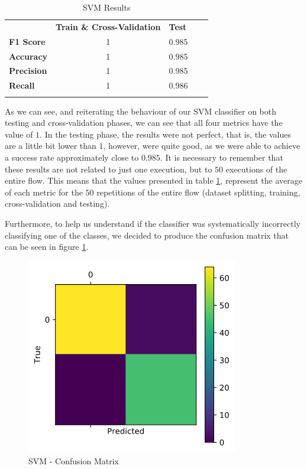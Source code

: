 \begin{table}[H]
\centering
\caption{SVM Results}
\begin{tabular}{ccccc}
\cline{2-3}
\multicolumn{1}{l|}{}                & \multicolumn{1}{l|}{\textbf{Train \& Cross-Validation}} & \multicolumn{1}{l|}{\textbf{Test}} &  &  \\ \cline{1-3}
\multicolumn{1}{|l|}{\textbf{F1 Score}} & \multicolumn{1}{c|}{1}                     & \multicolumn{1}{c|}{0.985}                              &  &  \\ \cline{1-3}
\multicolumn{1}{|l|}{\textbf{Accuracy}} & \multicolumn{1}{c|}{1}                     & \multicolumn{1}{c|}{0.985}                              &  &  \\ \cline{1-3}
\multicolumn{1}{|l|}{\textbf{Precision}} & \multicolumn{1}{c|}{1} & \multicolumn{1}{c|}{0.985} & & \\ \cline{1-3}
\multicolumn{1}{|l|}{\textbf{Recall}} & \multicolumn{1}{c|}{1} & \multicolumn{1}{c|}{0.986} & & \\\cline{1-3} & & & & 
\end{tabular}
\label{table:svm-results}
\end{table}

As we can see, and reiterating the behaviour of our SVM classifier on both testing and cross-validation phases, we can see that all four metrics have the value of \(1\). In the testing phase, the results were not perfect, that is, the values are a little bit lower than \(1\), however, were quite good, as we were able to achieve a success rate approximately close to \(0.985\). It is necessary to remember that these results are not related to just one execution, but to \(50\) executions of the entire flow. This means that the values presented in table \ref{table:svm-results}, represent the average of each metric for the \(50\) repetitions of the entire flow (dataset splitting, training, cross-validation and testing).

Furthermore, to help us understand if the classifier was systematically incorrectly classifying one of the classes, we decided to produce the confusion matrix that can be seen in figure \ref{fig:svm-confusion-matrix}.

\begin{figure}[htbp]
\centerline{\includegraphics[width=0.65\linewidth]{images/svm_conf_matrix.png}}
\caption{SVM - Confusion Matrix}
\label{fig:svm-confusion-matrix}
\end{figure}

